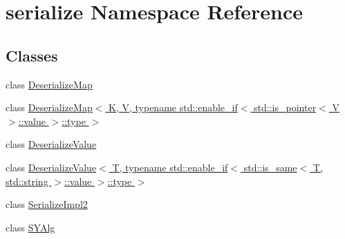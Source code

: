 \hypertarget{namespaceserialize}{}\section{serialize Namespace Reference}
\label{namespaceserialize}
\subsection*{Classes}
\begin{DoxyCompactItemize}
\item 
class \hyperlink{classserialize_1_1_deserialize_map}{Deserialize\+Map}
\item 
class \hyperlink{classserialize_1_1_deserialize_map_3_01_k_00_01_v_00_01typename_01std_1_1enable__if_3_01std_1_1ibe6cfa8a2d341f3a0942baedd95196d5}{Deserialize\+Map$<$ K, V, typename std\+::enable\+\_\+if$<$ std\+::is\+\_\+pointer$<$ V $>$\+::value $>$\+::type $>$}
\item 
class \hyperlink{classserialize_1_1_deserialize_value}{Deserialize\+Value}
\item 
class \hyperlink{classserialize_1_1_deserialize_value_3_01_t_00_01typename_01std_1_1enable__if_3_01std_1_1is__sambc4bb2b40dcc8b30285e8bdc35bf8b03}{Deserialize\+Value$<$ T, typename std\+::enable\+\_\+if$<$ std\+::is\+\_\+same$<$ T, std\+::string $>$\+::value $>$\+::type $>$}
\item 
class \hyperlink{classserialize_1_1_serialize_impl2}{Serialize\+Impl2}
\item 
class \hyperlink{classserialize_1_1_s_y_alg}{S\+Y\+Alg}
\end{DoxyCompactItemize}
